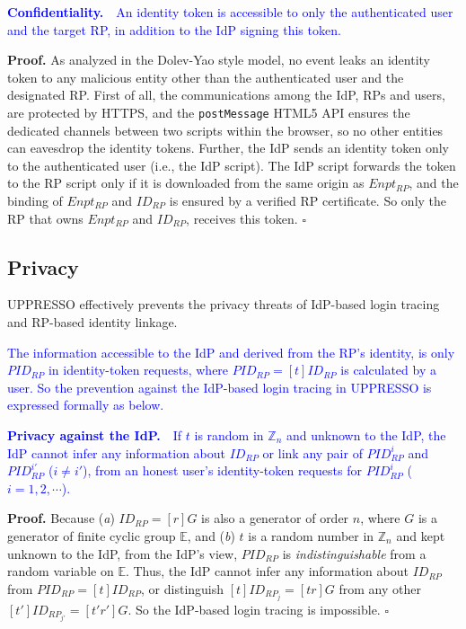 \vspace{1mm}
\noindent\textcolor{blue}{\textbf{Confidentiality.}~~An identity token
    is accessible to only
                the authenticated user and the target RP, in addition to the IdP signing this token.}

\vspace{0.75mm}
\noindent\textbf{Proof.}
As analyzed in the Dolev-Yao style model, no event leaks an identity token to any malicious entity other than the authenticated user and the designated RP.
First of all, the communications among the IdP, RPs and users,
    are protected by HTTPS,
    and the \verb+postMessage+ HTML5 API ensures the dedicated channels between two scripts within the browser,
    so no other entities can eavesdrop the identity tokens.
Further, the IdP sends an identity token only to the authenticated user
        (i.e., the IdP script).
The IdP script forwards the token to the RP script
 only if it is downloaded from the same origin as $Enpt_{RP}$,
and the binding of $Enpt_{RP}$ and $ID_{RP}$ is ensured by a verified RP certificate.
So only the RP that owns $Enpt_{RP}$ and $ID_{RP}$,
    receives this token. $\square$



\subsection{Privacy}
\label{sec-:analysis}
UPPRESSO effectively prevents the privacy threats of IdP-based login tracing and RP-based identity linkage.

\textcolor{blue}{The information accessible to the IdP and derived from the RP's identity,
    is only $PID_{RP}$ in identity-token requests, where $PID_{RP} = [t]ID_{RP}$ is calculated by a user.
So the prevention against the IdP-based login tracing in UPPRESSO
    is expressed formally as below.}

\vspace{1mm}
\noindent\textcolor{blue}{\textbf{Privacy against the IdP.}~~If $t$ is random in $\mathbb{Z}_n$ and unknown to the IdP,
the IdP
 cannot infer any information about $ID_{RP}$ or link any pair of $PID_{RP}^i$ and $PID_{RP}^{i'}$
  ($i \neq i'$),
    from an honest user's identity-token requests for $PID_{RP}^i$ ($i = 1, 2, \cdots$).}

\vspace{0.75mm}
\noindent\textbf{Proof.}
Because (\emph{a}) $ID_{RP} = [r]G$ is also a generator of order $n$,
        where $G$ is a generator of finite cyclic group $\mathbb{E}$,
    and (\emph{b}) $t$ is a random number in $\mathbb{Z}_n$ and kept unknown to the IdP,
 from the IdP's view,
 $PID_{RP}$
is \emph{indistinguishable} from a random variable on $\mathbb{E}$.
Thus,
    the IdP cannot infer any information about $ID_{RP}$ from $PID_{RP} = [t]ID_{RP}$,
or distinguish $[t]ID_{RP_j} = [tr]G$ from any other $[t']ID_{RP_{j'}} = [t'r']G$.
So the IdP-based login tracing is impossible. $\square$

